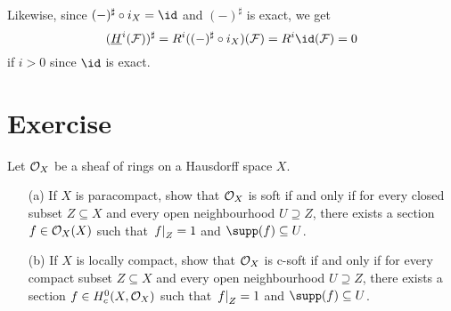 \documentclass[../main.tex]{subfiles}
\begin{document}
Likewise, since $(-)^\sharp \circ i_X = \id$ and $(-)^\sharp$ is exact, we get
\[(\underline{H}^i(\sh F))^\sharp = R^i((-)^\sharp \circ i_X)(\sh F) = R^i \id(\sh F) = 0\]
if $i>0$ since $\id$ is exact.

\section*{Exercise}

\begin{exe} Let $\mathcal{O}_X$ be a sheaf of rings on a Hausdorff space $X$.
\begin{enumerate}
    \item[(a)] If $X$ is paracompact, show that $\mathcal{O}_X$ is soft if and only if for every closed subset $Z\subseteq X$ and every open neighbourhood $U\supseteq Z$, there exists a section $f\in \mathcal{O}_X(X)$ such that $\left.f\right|_{Z} = 1$ and $\supp(f)\subseteq U$. 
    \item[(b)] If $X$ is locally compact, show that $\mathcal{O}_X$ is c-soft if and only if for every compact subset $Z\subseteq X$ and every open neighbourhood $U\supseteq Z$, there exists a section $f\in H^0_c(X, \mathcal{O}_X)$ such that $\left.f\right|_{Z} = 1$ and $\supp(f) \subseteq U$. 
\end{enumerate}

\end{exe}
\end{document}
